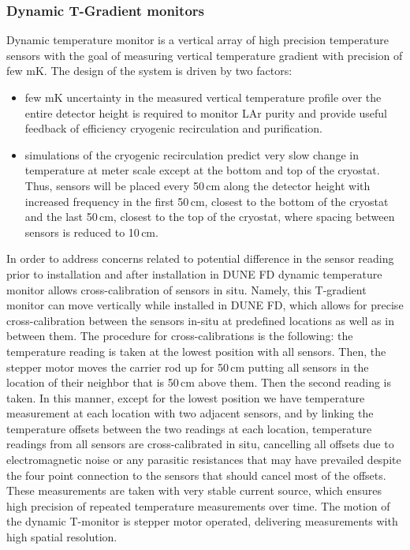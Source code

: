 \subsubsection{Dynamic T-Gradient monitors}

Dynamic temperature monitor is a vertical array of high precision temperature sensors with the goal of measuring vertical temperature gradient with precision of few mK. The design of the system is driven by two factors:
\begin{itemize}
\item
few mK uncertainty in the measured vertical temperature profile over the entire detector height is required to monitor LAr purity and provide useful feedback of efficiency cryogenic recirculation and purification.
\item
simulations of the cryogenic recirculation predict very slow change in temperature at meter scale except at the bottom and top of the cryostat. Thus, sensors will be placed every 50\,cm along the detector height with increased frequency in the first 50\,cm, closest to the bottom of the cryostat and the last 50\,cm, closest to the top of the cryostat, where spacing between sensors is reduced to 10\,cm.
 \end{itemize}
 
 In order to address concerns related to potential difference in the sensor reading prior to installation and after installation in DUNE FD dynamic temperature monitor allows cross-calibration of sensors in situ. Namely, this T-gradient monitor  can move vertically while installed in DUNE FD, which allows for precise cross-calibration between the sensors in-situ at predefined locations as well as in between them. The procedure for cross-calibrations is the following: the temperature reading is taken at the lowest position with all sensors. Then, the stepper motor moves the carrier rod up for 50\,cm putting all sensors in the location of their neighbor that is 50\,cm above them. Then the second reading is taken. In this manner, except for the lowest position we have temperature measurement at each location with two adjacent sensors, and by linking the temperature offsets between the two readings at each location, temperature readings from all sensors are cross-calibrated in situ, cancelling all offsets due to electromagnetic noise or any parasitic resistances that may have prevailed despite the four point connection to the sensors that should cancel most of the offsets. These measurements are taken with very stable current source, which ensures high precision of repeated temperature measurements over time. The motion of the dynamic T-monitor is stepper motor operated, delivering measurements with high spatial resolution. 



